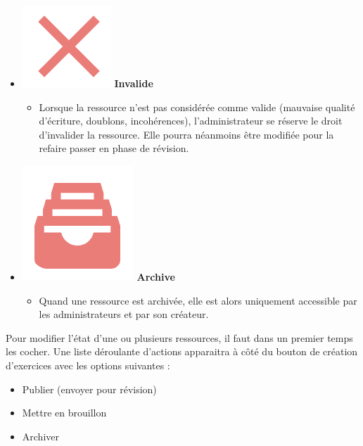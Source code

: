 \begin{itemize}
\begin{itemize}
    \end{itemize} 
    \item \includegraphics[scale=0.3]{images/client/not-validated.png} \textbf{Invalide}
    \begin{itemize}
        \item Lorsque la ressource n'est pas considérée comme valide (mauvaise qualité d'écriture, doublons, incohérences), l'administrateur se réserve le droit d'invalider la ressource. Elle pourra néanmoins être modifiée pour la refaire passer en phase de révision.
    \end{itemize}
    \item \includegraphics[scale=0.3]{images/client/archive.png} \textbf{Archive}
    \begin{itemize}
        \item Quand une ressource est archivée, elle est alors uniquement accessible par les administrateurs et par son créateur.
    \end{itemize}
\end{itemize}


Pour modifier l'état d'une ou plusieurs ressources, il faut dans un premier temps les cocher. Une liste déroulante d'actions apparaitra à côté du bouton de création d'exercices avec les options suivantes :

\begin{itemize}
    \item Publier (envoyer pour révision)
    \item Mettre en brouillon
    \item Archiver
\end{itemize}

